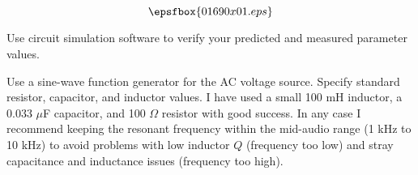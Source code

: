 

$$\epsfbox{01690x01.eps}$$

\vfil \eject






Use circuit simulation software to verify your predicted and measured parameter values.







Use a sine-wave function generator for the AC voltage source.  Specify standard resistor, capacitor, and inductor values.  I have used a small 100 mH inductor, a 0.033 $\mu$F capacitor, and 100 $\Omega$ resistor with good success.  In any case I recommend keeping the resonant frequency within the mid-audio range (1 kHz to 10 kHz) to avoid problems with low inductor $Q$ (frequency too low) and stray capacitance and inductance issues (frequency too high).




